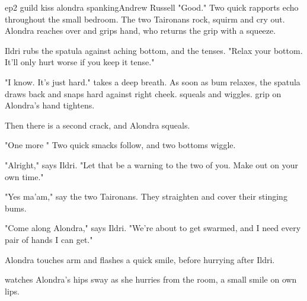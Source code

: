 \documentclass{book}
\begin{document}
\begin{childnode}{ep2 guild kiss alondra spanking}{Andrew Russell}
    "Good." Two quick rapports echo throughout the small bedroom. The two Taironans rock, squirm and cry out. Alondra reaches over and grips \names{} hand, who returns the grip with a squeeze.

    Ildri rubs the spatula against \names{} aching bottom, and the \boygirl{} tenses. "Relax your bottom. It'll only hurt worse if you keep it tense."

    "I know. It's just hard." \name{} takes a deep breath. As soon as \hisher{} bum relaxes, the spatula draws back and snaps hard against \hisher{} right cheek. \name{} squeals and wiggles. \HisHer{} grip on Alondra's hand tightens. 

    Then there is a second crack, and Alondra squeals.
    
    "One more " Two quick smacks follow, and two bottoms wiggle.

    "Alright," says Ildri. "Let that be a warning to the two of you. Make out on your own time."

    "Yes ma'am," say the two Taironans. They straighten and cover their stinging bums.

    "Come along Alondra," says Ildri. "We're about to get swarmed, and I need every pair of hands I can get."

    Alondra touches \names{} arm and flashes \himher{} a quick smile, before hurrying after Ildri.

    \name{} watches Alondra's hips sway as she hurries from the room, a small smile on \hisher{} own lips.


\end{childnode}
\end{document}
